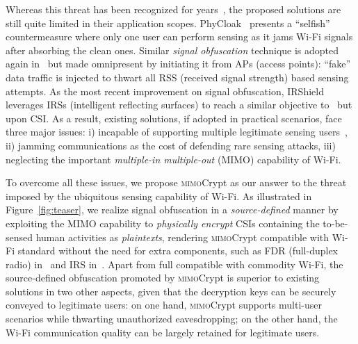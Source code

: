 \documentclass[conference,compsoc]{IEEEtran}
\newcommand{\name}{\textsc{mimo}Crypt\xspace}
\newcommand{\sname}{\textsc{mimo}Crypt\xspace}
\newcommand{\newrev}[1]{{\color{blue}#1}}    %
\newcommand{\newrev}[1]{#1}
\begin{document}
Whereas this threat has been recognized for years~\cite{PhyCloak-NSDI16,RogueAP-CCS16}, the proposed solutions are still quite limited in their application scopes. PhyCloak~\cite{PhyCloak-NSDI16} presents a ``selfish'' countermeasure where only one user can perform sensing as it jams Wi-Fi signals after absorbing the clean ones. Similar \textit{signal obfuscation} technique is adopted again in~\cite{EtTuAlexa-NDSS20} but made omnipresent by initiating it from APs (access points): ``fake'' data traffic is injected to thwart all RSS (received signal strength) based sensing attempts. As the most recent improvement on signal obfuscation, IRShield~\cite{IRShield-SP22} leverages IRSs (intelligent reflecting surfaces) to reach a similar objective to~\cite{EtTuAlexa-NDSS20} but upon CSI. As a result, existing solutions, if adopted in practical scenarios, %
face three major issues: i) incapable of supporting multiple legitimate sensing users~\cite{MUSE-Fi-MobiCom23}, ii) jamming communications as the cost of defending rare sensing attacks, iii) \newrev{neglecting the important
\textit{multiple-in multiple-out} (MIMO) capability of Wi-Fi.}


To overcome all these issues, we propose \name as our answer to the threat imposed by the ubiquitous sensing capability of Wi-Fi. As illustrated in Figure~\ref{fig:teaser}, we realize signal obfuscation in a \textit{source-defined} manner by exploiting the MIMO capability to \newrev{\textit{physically encrypt} CSIs containing the to-be-sensed human activities as \textit{plaintexts}, rendering \sname compatible} with Wi-Fi standard without the need for extra components, such as FDR (full-duplex radio) in~\cite{PhyCloak-NSDI16} and IRS in~\cite{IRShield-SP22}. Apart from full compatible with commodity Wi-Fi, the source-defined obfuscation promoted by \sname is superior to existing solutions in two other aspects, given that the \newrev{decryption} keys can be securely conveyed to legitimate users: on one hand, \sname supports multi-user scenarios while thwarting unauthorized eavesdropping; on the other hand, the Wi-Fi communication quality can be largely retained for legitimate users. 
\end{document}
